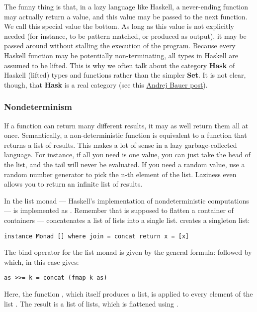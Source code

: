 The funny thing is that, in a lazy language like Haskell, a never-ending
function may actually return a value, and this value may be passed to
the next function. We call this special value the bottom. As long as
this value is not explicitly needed (for instance, to be pattern
matched, or produced as output), it may be passed around without
stalling the execution of the program. Because every Haskell function
may be potentially non-terminating, all types in Haskell are assumed to
be lifted. This is why we often talk about the category \textbf{Hask} of
Haskell (lifted) types and functions rather than the simpler
\textbf{Set}. It is not clear, though, that \textbf{Hask} is a real
category (see this
\href{http://math.andrej.com/2016/08/06/hask-is-not-a-category/}{Andrej
Bauer post}).

\subsubsection{Nondeterminism}\label{nondeterminism}

If a function can return many different results, it may as well return
them all at once. Semantically, a non-deterministic function is
equivalent to a function that returns a list of results. This makes a
lot of sense in a lazy garbage-collected language. For instance, if all
you need is one value, you can just take the head of the list, and the
tail will never be evaluated. If you need a random value, use a random
number generator to pick the n-th element of the list. Laziness even
allows you to return an infinite list of results.

In the list monad --- Haskell's implementation of nondeterministic
computations ---  is implemented as .
Remember that  is supposed to flatten a container of
containers ---  concatenates a list of lists into a
single list.  creates a singleton list:

\begin{verbatim}
instance Monad [] where join = concat return x = [x]
\end{verbatim}

The bind operator for the list monad is given by the general formula:
 followed by  which, in this case gives:

\begin{verbatim}
as >>= k = concat (fmap k as)
\end{verbatim}

Here, the function , which itself produces a list, is applied
to every element of the list . The result is a list of lists,
which is flattened using .

